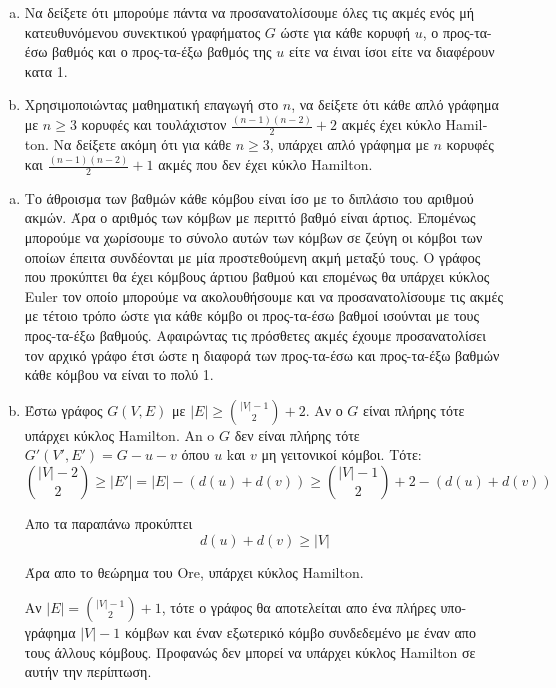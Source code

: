 \documentclass{assignment}
\begin{document}
\begin{enumerate}[(a)]

\item
Να δείξετε ότι μπορούμε πάντα να προσανατολίσουμε όλες τις ακμές ενός μή κατευθυνόμενου συνεκτικού γραφήματος $G$ ώστε
για κάθε κορυφή $u$, ο προς-τα-έσω βαθμός και ο προς-τα-έξω βαθμός της $u$ είτε να έιναι ίσοι είτε να διαφέρουν κατα 1.

\item
Χρησιμοποιώντας μαθηματική επαγωγή στο $n$, να δείξετε ότι κάθε απλό γράφημα με $n \ge 3$ κορυφές και τουλάχιστον 
$\frac{(n-1)(n-2)}{2} +2$ ακμές έχει κύκλο \textlatin{Hamilton}. Να δείξετε ακόμη ότι για κάθε $n \ge 3$, υπάρχει 
απλό γράφημα με $n$ κορυφές και $\frac{(n-1)(n-2)}{2} + 1$ ακμές που δεν έχει κύκλο \textlatin{Hamilton}.

\end{enumerate}

\solution

\begin{enumerate}[(a)]

\item 
Το άθροισμα των βαθμών κάθε κόμβου είναι ίσο με το διπλάσιο του αριθμού ακμών. Άρα ο αριθμός των κόμβων με
περιττό βαθμό είναι άρτιος. Επομένως μπορούμε να χωρίσουμε το σύνολο αυτών των κόμβων σε ζεύγη οι κόμβοι των 
οποίων έπειτα συνδέονται με μία προστεθούμενη ακμή μεταξύ τους. Ο γράφος που προκύπτει θα έχει κόμβους άρτιου βαθμού και επομένως θα υπάρχει
κύκλος \textlatin{Euler} τον οποίο μπορούμε να ακολουθήσουμε και να προσανατολίσουμε τις ακμές με τέτοιο τρόπο
ώστε για κάθε κόμβο οι προς-τα-έσω βαθμοί ισούνται με τους προς-τα-έξω βαθμούς. Αφαιρώντας τις πρόσθετες ακμές έχουμε
προσανατολίσει τον αρχικό γράφο έτσι ώστε η διαφορά των προς-τα-έσω και προς-τα-έξω βαθμών κάθε κόμβου να είναι το πολύ 1.

\item 
Έστω γράφος $G(V, E)$ με $|E| \ge \binom{|V|-1}{2} + 2$. Αν ο $G$ είναι πλήρης τότε υπάρχει κύκλος \textlatin{Hamilton}.
An o $G$ δεν είναι πλήρης τότε $G'(V', E') = G - u - v$ όπου $u$ kαι $v$ μη γειτονικοί κόμβοι. Τότε:
\begin{equation*}
\binom{|V|-2}{2} \ge |E'| = |E| - (d(u) + d(v)) \ge \binom{|V|-1}{2} + 2 - (d(u) + d(v))
\end{equation*}

Απο τα παραπάνω προκύπτει
\begin{equation*}
d(u) + d(v) \ge |V|
\end{equation*}

Άρα απο το θεώρημα του \textlatin{Ore}, υπάρχει κύκλος \textlatin{Hamilton}.

Αν $|E|= \binom{|V|-1}{2} + 1$, τότε ο γράφος θα αποτελείται απο ένα πλήρες υπο-γράφημα $|V|-1$ κόμβων και έναν εξωτερικό κόμβο
συνδεδεμένο με έναν απο τους άλλους κόμβους. Προφανώς δεν μπορεί να υπάρχει κύκλος \textlatin{Hamilton} σε αυτήν την περίπτωση.
\end{enumerate}
\end{document}
